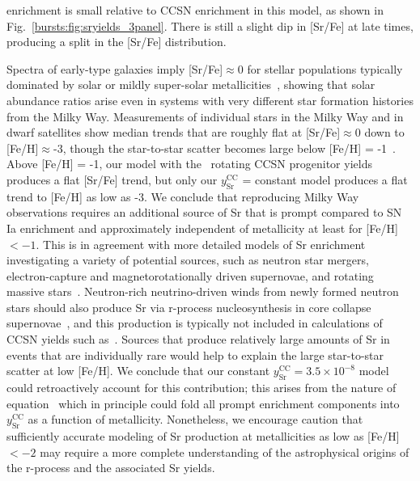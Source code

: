 enrichment is small relative to CCSN enrichment in this model, as shown in 
Fig.~\ref{bursts:fig:sryields_3panel}. There is still a slight dip in [Sr/Fe] at 
late times, producing a split in the [Sr/Fe] distribution. 
\par 
Spectra of early-type galaxies imply [Sr/Fe]$\approx$0 for stellar populations 
typically dominated by solar or mildly super-solar 
metallicities~\citep{Conroy2013a}, showing that solar abundance ratios arise 
even in systems with very different star formation histories from the Milky 
Way. Measurements of individual stars in the Milky Way and in dwarf satellites 
show median trends that are roughly flat at [Sr/Fe]$\approx$0 down to 
[Fe/H]$\approx$-3, though the star-to-star scatter becomes large below 
[Fe/H] = -1~\citep[see, e.g.,][and references therein]{Mishenina2019, 
Hirai2019}. Above [Fe/H] = -1, our model with the~\citet{Limongi2018} rotating 
CCSN progenitor yields produces a flat [Sr/Fe] trend, but only our 
$y_\text{Sr}^\text{CC}$ = constant model produces a flat trend to [Fe/H] as low 
as -3. We conclude that reproducing Milky Way observations requires an 
additional source of Sr that is prompt compared to SN Ia enrichment and 
approximately independent of metallicity at least for [Fe/H] $< -1$. This is 
in agreement with more detailed models of Sr enrichment investigating a 
variety of potential sources, such as neutron star mergers, electron-capture 
and magnetorotationally driven supernovae, and rotating massive 
stars~\citep[e.g.][]{Cescutti2014, Cescutti2015, Prantzos2018, Hirai2019, 
Rizzuti2019}. Neutron-rich neutrino-driven winds from newly 
formed neutron stars should also produce Sr via r-process nucleosynthesis in 
core collapse supernovae~\citep{Thompson2001,Vlasov2017,Thompson2018}, and 
this production is typically not included in calculations of CCSN yields such 
as~\citet{Limongi2018}. Sources that produce relatively large amounts of Sr in 
events that are individually rare would help to explain the large star-to-star 
scatter at low [Fe/H]. We conclude that our constant $y_\text{Sr}^\text{CC} = 
3.5\times10^{-8}$ model could retroactively account for this contribution; 
this arises from the nature of equation~ which in principle 
could fold all prompt enrichment components into $y_\text{Sr}^\text{CC}$ as a 
function of metallicity. Nonetheless, we encourage caution that sufficiently 
accurate modeling of Sr production at metallicities as low as [Fe/H] $< -2$ 
may require a more complete understanding of the astrophysical origins of the 
r-process and the associated Sr yields. 



